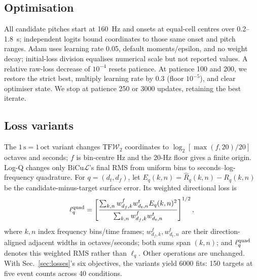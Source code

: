 \documentclass[conference]{IEEEtran}
\newcommand{\tfw}{\ensuremath{\mathrm{TF}\mathcal{W}_2}}
\newcommand{\bicul}{\ensuremath{\mathrm{BiCu}\mathcal{L}}}
\begin{document}
\subsection{Optimisation}
All candidate pitches start at 160~Hz and onsets at equal-cell centres over
0.2--1.8~s; independent logits bound coordinates to those same onset and pitch
ranges. Adam uses learning rate 0.05, default moments/epsilon, and no weight
decay; initial-loss division equalises numerical scale but not reported values.
A relative raw-loss decrease of $10^{-4}$ resets patience. At patience 100 and
200, we restore the strict best, multiply learning rate by 0.3 (floor
$10^{-5}$), and clear optimiser state. We stop at patience 250 or 3000 updates,
retaining the best iterate.

\subsection{Loss variants}
\label{sec:loss-variants}
The $1\,\mathrm{s}=1\,\mathrm{oct}$ variant changes \tfw{} coordinates to
$\log_2[\max(f,20)/20]$ octaves and seconds; $f$ is bin-centre Hz and the
20-Hz floor gives a finite origin. Log-Q changes only \bicul's final RMS from
uniform bins to seconds--log-frequency quadrature. For $q=(d_t,d_f)$, let
$E_q(k,n)=\hat R_q(k,n)-R_q(k,n)$ be the candidate-minus-target surface error.
Its weighted directional loss is
\begin{equation}
\ell^{\rm quad}_{q}=\left[\frac{\sum_{k,n}
w^f_{d_f,k}w^t_{d_t,n}E_q(k,n)^2}
{\sum_{k,n}w^f_{d_f,k}w^t_{d_t,n}}\right]^{1/2},
\end{equation}
where $k,n$ index frequency bins/time frames; $w^f_{d_f,k},w^t_{d_t,n}$ are
their direction-aligned adjacent widths in octaves/seconds; both sums span
$(k,n)$; and $\ell^{\rm quad}_q$ denotes this weighted RMS rather than
$\ell_q$. Other operations are unchanged. With Sec.~\ref{sec:losses}'s six
objectives, the variants yield 6000 fits: 150 targets at five event counts
across 40 conditions.
\end{document}
